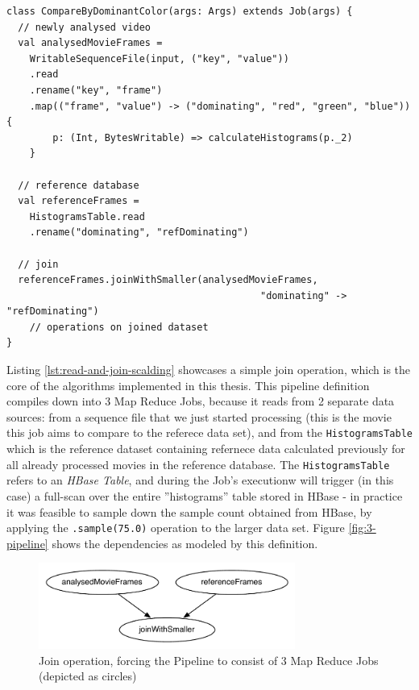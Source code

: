 \begin{lstlisting}[caption={Scalding job, reading data from 2 sources and joining them on dominantColor, producing 3 Map Reduce Jobs}, label={lst:read-and-join-scalding}]
class CompareByDominantColor(args: Args) extends Job(args) {
  // newly analysed video
  val analysedMovieFrames = 
    WritableSequenceFile(input, ("key", "value"))
    .read
    .rename("key", "frame")
    .map(("frame", "value") -> ("dominating", "red", "green", "blue")) { 
        p: (Int, BytesWritable) => calculateHistograms(p._2)
    }
  
  // reference database
  val referenceFrames = 
    HistogramsTable.read
    .rename("dominating", "refDominating")

  // join
  referenceFrames.joinWithSmaller(analysedMovieFrames, 
                                            "dominating" -> "refDominating")
    // operations on joined dataset
}
\end{lstlisting}

Listing \ref{lst:read-and-join-scalding} showcases a simple join operation, which is the core of the algorithms implemented in this thesis. This pipeline definition compiles down into 3 Map Reduce Jobs, because it reads from 2 separate data sources: from a sequence file that we just started processing (this is the movie this job aims to compare to the referece data set), and from the \verb|HistogramsTable| which is the reference dataset containing refernece data calculated previously for all already processed movies in the reference database. The \verb|HistogramsTable| refers to an \textit{HBase Table}, and during the Job's executionw will trigger (in this case) a full-scan over the entire ''histograms'' table stored in HBase - in practice it was feasible to sample down the sample count obtained from HBase, by applying the \verb|.sample(75.0)| operation to the larger data set. Figure \ref{fig:3-pipeline} shows the dependencies as modeled by this definition.

\begin{figure}[ch!]
  \centering
  \includegraphics[width=0.75\textwidth]{img/second-simplest-pipeline}
  \caption{Join operation, forcing the Pipeline to consist of 3 Map Reduce Jobs (depicted as circles)}
\end{figure}



